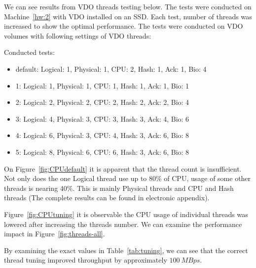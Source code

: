 \documentclass[
  color, %
  table, %
  lof,   %
  lot,   %
]{fithesis3}
\begin{document}
We can see results from VDO threads testing below. The tests were conducted on Machine~\ref{hw:2} with VDO installed on an SSD. Each test, number of threads was increased to show the optimal performance. The tests were conducted on VDO volumes with following settings of VDO threads:

Conducted tests:
\begin{itemize}
    \item default: Logical: 1, Physical: 1, CPU: 2, Hash: 1, Ack: 1, Bio: 4
    \item 1: Logical: 1, Physical: 1, CPU: 1, Hash: 1, Ack: 1, Bio: 1
    \item 2: Logical: 2, Physical: 2, CPU: 2, Hash: 2, Ack: 2, Bio: 4
    \item 3: Logical: 4, Physical: 3, CPU: 3, Hash: 3, Ack: 4, Bio: 6
    \item 4: Logical: 6, Physical: 3, CPU: 4, Hash: 3, Ack: 6, Bio: 8
    \item 5: Logical: 8, Physical: 6, CPU: 6, Hash: 3, Ack: 6, Bio: 8
\end{itemize}

On Figure~\ref{fig:CPUdefault} it is apparent that the thread count is insufficient. Not only does the one Logical thread use up to 80\% of CPU, usage of some other threads is nearing 40\%. This is mainly Physical threads and CPU and Hash threads (The complete results can be found in electronic appendix).

Figure~\ref{fig:CPUtuning} it is observable the CPU usage of individual threads was lowered after increasing the threads number. We can examine the performance impact in Figure~\ref{fig:threads-all}.

By examining the exact values in Table~\ref{tab:tuning}, we can see that the correct thread tuning improved throughput by approximately $\SI{100}{MBps}$.
\end{document}
